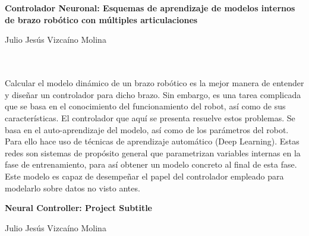 \chapter*{}






\cleardoublepage
\thispagestyle{empty}

\begin{center}
{\large\bfseries Controlador Neuronal: Esquemas de aprendizaje de modelos internos de brazo robótico con múltiples articulaciones}\\
\end{center}
\begin{center}
Julio Jesús Vizcaíno Molina\\
\end{center}

\\

\vspace{0.7cm}
\\

Calcular el modelo dinámico de un brazo robótico es la mejor manera de entender y diseñar un controlador para dicho brazo. Sin embargo, es una tarea complicada que se basa en el conocimiento del funcionamiento del robot, así como de sus características. El controlador que aquí se presenta resuelve estos problemas. Se basa en el auto-aprendizaje del modelo, así como de los parámetros del robot. Para ello hace uso de técnicas de aprendizaje automático (Deep Learning). Estas redes son sistemas de propósito general que parametrizan variables internas en la fase de entrenamiento, para así obtener un modelo concreto al final de esta fase. Este modelo es capaz de desempeñar el papel del controlador empleado para modelarlo sobre datos no visto antes.
\cleardoublepage


\thispagestyle{empty}


\begin{center}
{\large\bfseries Neural Controller: Project Subtitle}\\
\end{center}
\begin{center}
Julio Jesús Vizcaíno Molina\\
\end{center}


